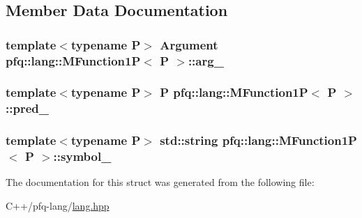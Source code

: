 \subsection{Member Data Documentation}
\hypertarget{structpfq_1_1lang_1_1MFunction1P_a1fe2d616ed9b95dca4df3afd789f67a1}{
\subsubsection[{arg\+\_\+}]{\setlength{\rightskip}{0pt plus 5cm}template$<$typename P$>$ {\bf Argument} {\bf pfq\+::lang\+::\+M\+Function1\+P}$<$ P $>$\+::arg\+\_\+}}\label{structpfq_1_1lang_1_1MFunction1P_a1fe2d616ed9b95dca4df3afd789f67a1}
\hypertarget{structpfq_1_1lang_1_1MFunction1P_aaf4704c14197b82e61b5ddb8ff87b46f}{
\subsubsection[{pred\+\_\+}]{\setlength{\rightskip}{0pt plus 5cm}template$<$typename P$>$ P {\bf pfq\+::lang\+::\+M\+Function1\+P}$<$ P $>$\+::pred\+\_\+}}\label{structpfq_1_1lang_1_1MFunction1P_aaf4704c14197b82e61b5ddb8ff87b46f}
\hypertarget{structpfq_1_1lang_1_1MFunction1P_a23f2aa86429240320e676f185cee857e}{
\subsubsection[{symbol\+\_\+}]{\setlength{\rightskip}{0pt plus 5cm}template$<$typename P$>$ std\+::string {\bf pfq\+::lang\+::\+M\+Function1\+P}$<$ P $>$\+::symbol\+\_\+}}\label{structpfq_1_1lang_1_1MFunction1P_a23f2aa86429240320e676f185cee857e}


The documentation for this struct was generated from the following file\+:\begin{DoxyCompactItemize}
\item 
C++/pfq-\/lang/\hyperlink{lang_8hpp}{lang.\+hpp}\end{DoxyCompactItemize}
